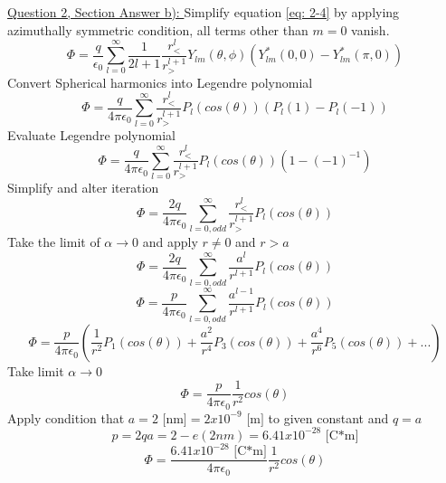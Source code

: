 \documentclass[12pt]{article}
\begin{document}
    \underline{Question 2, Section Answer b): }
    Simplify equation \ref{eq: 2-4} by applying azimuthally symmetric condition, all terms other than $m=0$ vanish.
    \begin{equation} \label{eq: 2-6}
        \Phi = \frac{q}{\epsilon_0} \sum_{l=0}^\infty  \frac{1}{2l+1} \frac{r_<^l}{r_>^{l+1}} Y_{lm}(\theta, \phi) \left( Y_{lm}^*(0, 0) - Y_{lm}^*(\pi, 0) \right)
    \end{equation}
    \newline Convert Spherical harmonics into Legendre polynomial
    \begin{equation} \label{eq: 2-7}
        \Phi = \frac{q}{4 \pi \epsilon_0} \sum_{l=0}^\infty   \frac{r_<^l}{r_>^{l+1}} P_{l}(cos(\theta)) \left(P_{l}(1) - P_{l}(-1) \right)
    \end{equation}
    \newline Evaluate Legendre polynomial
    \begin{equation} \label{eq: 2-8}
        \Phi = \frac{q}{4 \pi \epsilon_0} \sum_{l=0}^\infty   \frac{r_<^l}{r_>^{l+1}} P_{l}(cos(\theta)) \left(1-{(-1)}^{-1} \right)
    \end{equation}
    \newline Simplify and alter iteration
    \begin{equation} \label{eq: 2-9}
        \Phi = \frac{2q}{4 \pi \epsilon_0} \sum_{l=0, odd}^\infty   \frac{r_<^l}{r_>^{l+1}} P_{l}(cos(\theta))
    \end{equation}
    Take the limit of $\alpha \rightarrow{} 0$ and apply $r \neq 0$ and $r>a$
    \begin{equation} \label{eq: 2-10}
        \Phi = \frac{2q}{4 \pi \epsilon_0} \sum_{l=0, odd}^\infty   \frac{a^l}{r^{l+1}} P_{l}(cos(\theta)) 
    \end{equation}
    \begin{equation} \label{eq: 2-11}
        \Phi = \frac{p}{4 \pi \epsilon_0} \sum_{l=0, odd}^\infty   \frac{a^{l-1}}{r^{l+1}} P_{l}(cos(\theta)) 
    \end{equation}
    \begin{equation} \label{eq: 2-12}
        \Phi = \frac{p}{4 \pi \epsilon_0} \left(\frac{1}{r^2} P_1(cos(\theta)) + \frac{a^2}{r^4} P_3(cos(\theta)) + \frac{a^4}{r^6} P_5(cos(\theta)) +... \right) 
    \end{equation}
    Take limit $\alpha \rightarrow{} 0$
    \begin{equation} \label{eq: 2-13}
        \Phi = \frac{p}{4 \pi \epsilon_0} \frac{1}{r^2} cos(\theta)
    \end{equation}
    Apply condition that $a= 2 \text{ [nm]} = 2 x 10^{-9} \text{ [m]}$ to given constant and $q=a$
    \begin{equation} \label{eq: 2-13.1}
        p = 2 q a = 2 -e (2nm) = 6.41 x 10^{-28} \text{ [C*m]}
    \end{equation}
    \begin{equation} \label{eq: 2-13.2}
        \Phi = \frac{6.41 x 10^{-28} \text{ [C*m]}}{4 \pi \epsilon_0} \frac{1}{r^2} cos(\theta)
    \end{equation}
    
\end{document}
